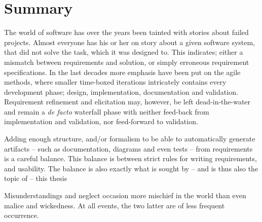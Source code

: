 \chapter{Summary}
The world of software has over the years been tainted with stories about failed projects. Almost everyone has his or her on story about a given software system, that did not solve the task, which it was designed to. This indicates; either a mismatch between requirements and solution, or simply erroneous requirement specifications. In the last decades more emphasis have been put on the agile methods, where smaller time-boxed iterations intricately contains every development phase; design, implementation, documentation and validation. Requirement refinement and elicitation may, however, be left dead-in-the-water and remain a \emph{de facto} waterfall phase with neither feed-back from implementation and validation, nor feed-forward to validation.\bigskip

\noindent Adding enough structure, and/or formalism to be able to automatically generate artifacts -- such as documentation, diagrams and even tests -- from requirements is a careful balance. This balance is between strict rules for writing requirements, and usability. The balance is also exactly what is sought by -- and is thus also the topic of -- this thesis
\newpage
\begin{fquote}Misunderstandings and neglect occasion more mischief in the world than even malice and wickedness. At all events, the two latter are of less frequent occurrence.
\end{fquote}